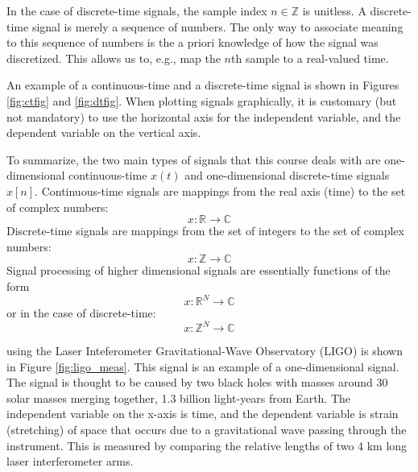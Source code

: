 In the case of discrete-time signals, the sample index
$n \in \mathbb{Z}$ is unitless. A discrete-time signal is merely a sequence of numbers. The only way to associate meaning to this sequence of numbers is the a priori knowledge of how the signal was discretized. This allows us to, e.g., map the $n$th sample to a real-valued time.

An example of a continuous-time and a discrete-time signal is shown in Figures \ref{fig:ctfig} and \ref{fig:dtfig}. When plotting signals graphically, it is customary (but not mandatory) to use the horizontal axis for the independent variable, and the dependent variable on the vertical axis.

To summarize, the two main types of signals that this course deals with are one-dimensional continuous-time $x(t)$ and one-dimensional discrete-time signals $x[n]$. Continuous-time signals are mappings from the real axis (time) to the set of complex numbers:
\begin{equation}
\boxed{
x: \mathbb{R} \rightarrow \mathbb{C}
}
\end{equation}
Discrete-time signals are mappings from the set of integers to the set of complex numbers:
\begin{equation}
\boxed{
x: \mathbb{Z} \rightarrow \mathbb{C}
}
\end{equation}
Signal processing of higher dimensional signals are essentially functions of the form
\begin{equation}
x: \mathbb{R}^N \rightarrow \mathbb{C}
\end{equation}
or in the case of discrete-time:
\begin{equation}
x: \mathbb{Z}^N \rightarrow \mathbb{C}
\end{equation}

 using the Laser Inteferometer Gravitational-Wave Observatory (LIGO) is shown in Figure \ref{fig:ligo_meas}. This signal is an example of a one-dimensional signal. The signal is thought to be caused by two black holes with masses around 30 solar masses merging together, 1.3 billion light-years from Earth. The independent variable on the x-axis is time, and the dependent variable is strain (stretching) of space that occurs due to a gravitational wave passing through the instrument. This is measured by comparing the relative lengths of two 4 km long laser interferometer arms. 

